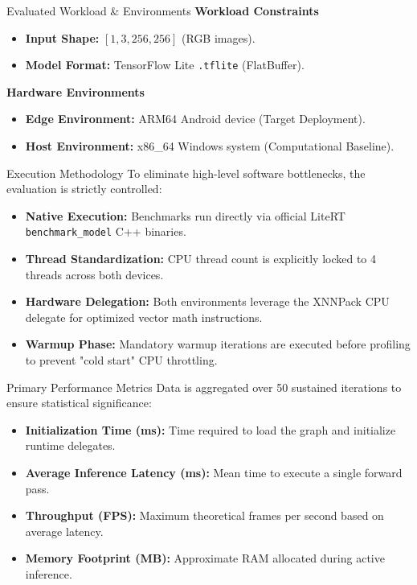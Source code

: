 \documentclass[11pt]{beamer}
\begin{document}
\begin{frame}{Evaluated Workload \& Environments}
    \textbf{Workload Constraints}
    \begin{itemize}
        \item \textbf{Input Shape:} $[1, 3, 256, 256]$ (RGB images).
        \item \textbf{Model Format:} TensorFlow Lite \texttt{.tflite} (FlatBuffer).
    \end{itemize}
    \vspace{0.5cm}
    \textbf{Hardware Environments}
    \begin{itemize}
        \item \textbf{Edge Environment:} ARM64 Android device (Target Deployment).
        \item \textbf{Host Environment:} x86\_64 Windows system (Computational Baseline).
    \end{itemize}
\end{frame}

\begin{frame}{Execution Methodology}
    To eliminate high-level software bottlenecks, the evaluation is strictly controlled:
    \vspace{0.5cm}
    \begin{itemize}
        \item \textbf{Native Execution:} Benchmarks run directly via official LiteRT \texttt{benchmark\_model} C++ binaries.
        \item \textbf{Thread Standardization:} CPU thread count is explicitly locked to 4 threads across both devices.
        \item \textbf{Hardware Delegation:} Both environments leverage the XNNPack CPU delegate for optimized vector math instructions.
        \item \textbf{Warmup Phase:} Mandatory warmup iterations are executed before profiling to prevent "cold start" CPU throttling.
    \end{itemize}
\end{frame}

\begin{frame}{Primary Performance Metrics}
    Data is aggregated over 50 sustained iterations to ensure statistical significance:
    \vspace{0.5cm}
    \begin{itemize}
        \item \textbf{Initialization Time (ms):} Time required to load the graph and initialize runtime delegates.
        \item \textbf{Average Inference Latency (ms):} Mean time to execute a single forward pass.
        \item \textbf{Throughput (FPS):} Maximum theoretical frames per second based on average latency.
        \item \textbf{Memory Footprint (MB):} Approximate RAM allocated during active inference.
    \end{itemize}
\end{frame}
\end{document}
